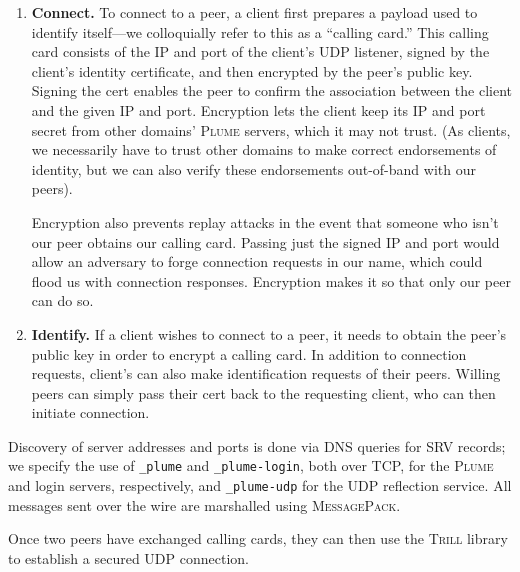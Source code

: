 \documentclass[11pt]{article}
\newcommand{\Trill}{\textsc{Trill}\xspace}
\newcommand{\Plume}{\textsc{Plume}\xspace}
\begin{document}
\begin{enumerate}
  \item \textbf{Connect.}  To connect to a peer, a client first prepares a
    payload used to identify itself---we colloquially refer to this as a
    ``calling card.''  This calling card consists of the IP and port of the
    client's UDP listener, signed by the client's identity certificate, and
    then encrypted by the peer's public key.  Signing the cert enables the peer
    to confirm the association between the client and the given IP and port.
    Encryption lets the client keep its IP and port secret from other domains'
    \Plume servers, which it may not trust.  (As clients, we necessarily have
    to trust other domains to make correct endorsements of identity, but we can
    also verify these endorsements out-of-band with our peers).

    Encryption also prevents replay attacks in the event that someone who isn't
    our peer obtains our calling card.  Passing just the signed IP and port
    would allow an adversary to forge connection requests in our name, which
    could flood us with connection responses.  Encryption makes it so that only
    our peer can do so.

  \item \textbf{Identify.}  If a client wishes to connect to a peer, it needs
    to obtain the peer's public key in order to encrypt a calling card.  In
    addition to connection requests, client's can also make identification
    requests of their peers.  Willing peers can simply pass their cert back to
    the requesting client, who can then initiate connection.
\end{enumerate}

Discovery of server addresses and ports is done via DNS queries for SRV
records; we specify the use of \verb`_plume` and \verb`_plume-login`, both over
TCP, for the \Plume and login servers, respectively, and \verb`_plume-udp` for
the UDP reflection service.  All messages sent over the wire are marshalled
using \textsc{MessagePack}.

Once two peers have exchanged calling cards, they can then use the \Trill
library to establish a secured UDP connection.
\end{document}
